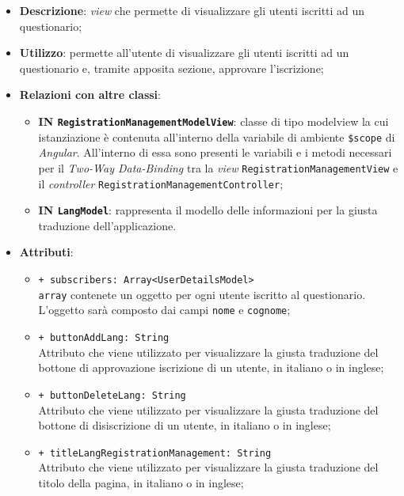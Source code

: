 \begin{itemize}
	\item \textbf{Descrizione}: \textit{view} che permette di visualizzare gli utenti iscritti ad un questionario;
	\item \textbf{Utilizzo}: permette all'utente di visualizzare gli utenti iscritti ad un questionario e, tramite apposita sezione, approvare l'iscrizione;
	\item \textbf{Relazioni con altre classi}:
	\begin{itemize}
		\item \textbf{IN \texttt{RegistrationManagementModelView}}: classe di tipo modelview la cui istanziazione è contenuta all'interno della variabile di ambiente \texttt{\$scope} di \textit{Angular}. All'interno di essa sono presenti le variabili e i metodi necessari per il \textit{Two-Way Data-Binding} tra la \textit{view} \texttt{RegistrationManagementView} e il \textit{controller} \texttt{RegistrationManagementController};
		\item \textbf{IN \texttt{LangModel}}: rappresenta il modello delle informazioni per la giusta traduzione dell'applicazione.
	\end{itemize}
	\item \textbf{Attributi}:
	\begin{itemize}
		\item \texttt{+ subscribers: Array<UserDetailsModel>} \\ \texttt{array} contenete un oggetto per ogni utente iscritto al questionario. L'oggetto sarà composto dai campi \texttt{nome} e \texttt{cognome};
		\item \texttt{+ buttonAddLang: String} \\ Attributo che viene utilizzato per visualizzare la giusta traduzione del bottone di approvazione iscrizione di un utente, in italiano o in inglese;
		\item \texttt{+ buttonDeleteLang: String} \\ Attributo che viene utilizzato per visualizzare la giusta traduzione del bottone di disiscrizione di un utente, in italiano o in inglese;
		\item \texttt{+ titleLangRegistrationManagement: String} \\ Attributo che viene utilizzato per visualizzare la giusta traduzione del titolo della pagina, in italiano o in inglese;		
	\end{itemize}
\end{itemize}